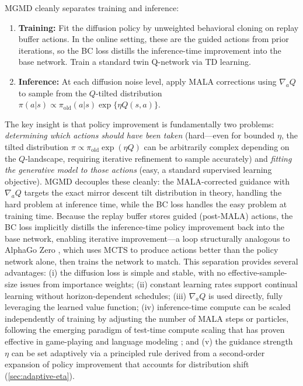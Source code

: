 \documentclass{article}
\theoremstyle{plain}
\theoremstyle{definition}
\theoremstyle{remark}
\begin{document}
MGMD cleanly separates training and inference:
\begin{enumerate}
  \item \textbf{Training:} Fit the diffusion policy by unweighted behavioral cloning on replay buffer actions. In the online setting, these are the guided actions from prior iterations, so the BC loss distills the inference-time improvement into the base network. Train a standard twin Q-network via TD learning.
  \item \textbf{Inference:} At each diffusion noise level, apply MALA corrections using $\nabla_a Q$ to sample from the $Q$-tilted distribution $\pi(a|s) \propto \pi_\mathrm{old}(a|s)\exp\{\eta Q(s,a)\}$.
\end{enumerate}
The key insight is that policy improvement is fundamentally two problems: \emph{determining which actions should have been taken} (hard---even for bounded $\eta$, the tilted distribution $\pi \propto \pi_{\mathrm{old}} \exp(\eta Q)$ can be arbitrarily complex depending on the $Q$-landscape, requiring iterative refinement to sample accurately) and \emph{fitting the generative model to those actions} (easy, a standard supervised learning objective).
MGMD decouples these cleanly: the MALA-corrected guidance with $\nabla_a Q$ targets the exact mirror descent tilt distribution in theory, handling the hard problem at inference time, while the BC loss handles the easy problem at training time.
Because the replay buffer stores guided (post-MALA) actions, the BC loss implicitly distills the inference-time policy improvement back into the base network, enabling iterative improvement---a loop structurally analogous to AlphaGo Zero \citep{silver2017mastering}, which uses MCTS to produce actions better than the policy network alone, then trains the network to match.
This separation provides several advantages: (i) the diffusion loss is simple and stable, with no effective-sample-size issues from importance weights; (ii) constant learning rates support continual learning without horizon-dependent schedules; (iii) $\nabla_a Q$ is used directly, fully leveraging the learned value function; (iv) inference-time compute can be scaled independently of training by adjusting the number of MALA steps or particles, following the emerging paradigm of test-time compute scaling that has proven effective in game-playing \citep{silver2017mastering} and language modeling \citep{snell2024scaling}; and (v) the guidance strength $\eta$ can be set adaptively via a principled rule derived from a second-order expansion of policy improvement that accounts for distribution shift (\cref{sec:adaptive-eta}).
\end{document}
